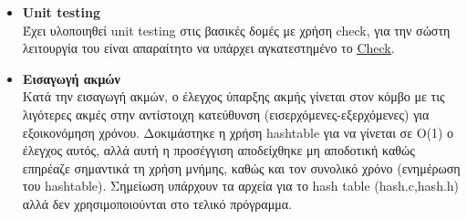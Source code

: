 \documentclass[11pt]{article}
\begin{document}
\begin{itemize}
\begin{itemize}
\end{itemize}
\item \textbf{Unit testing}\\ Έχει υλοποιηθεί unit testing στις βασικές δομές με χρήση check, για την σώστη λειτουργία του είναι απαραίτητο να υπάρχει αγκατεστημένο το {\color{blue}\underline{\href{https://libcheck.github.io/check/}{Check}}}.
\item \textbf{Εισαγωγή ακμών}\\ Κατά την εισαγωγή ακμών, ο έλεγχος ύπαρξης ακμής γίνεται στον κόμβο με τις λιγότερες ακμές στην αντίστοιχη κατεύθυνση (εισερχόμενες-εξερχόμενες) για εξοικονόμηση χρόνου. Δοκιμάστηκε η χρήση hashtable για να γίνεται σε O(1) ο έλεγχος αυτός, αλλά αυτή η προσέγγιση αποδείχθηκε μη αποδοτική καθώς επηρέαζε σημαντικά τη χρήση μνήμης, καθώς και τον συνολικό χρόνο (ενημέρωση του hashtable). Σημείωση υπάρχουν τα αρχεία για το hash table (hash.c,hash.h) αλλά δεν χρησιμοποιούνται στο τελικό πρόγραμμα.
\end{itemize}
\end{document}
